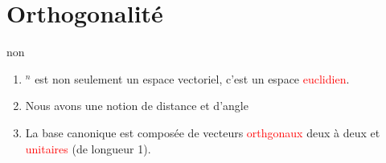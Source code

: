 \chapter{Orthogonalité}
\begin{parag}{non}
    

\begin{enumerate}
    \item \R$^n$ est non seulement un espace vectoriel, c'est un espace \textcolor{red}{euclidien}.
    \item  Nous avons une notion de distance et d'angle
    \item La base canonique est composée de vecteurs \textcolor{red}{orthgonaux} deux à deux et \textcolor{red}{unitaires} (de longueur 1).
\end{enumerate}

\end{parag}

